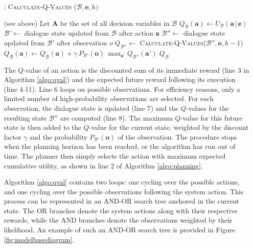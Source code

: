 \begin{algorithm}[h!]
\caption{: \textsc{Calculate-Q-Values} ($\mathcal{B}, \mathbf{e}, h)$}
\begin{algorithmic}[1] \vspace{1mm}
\REQUIRE (see above)
\STATE Let $\mathbf{A}$ be the set of all decision variables in $\mathcal{B}$
\STATE $Q_{\mathcal{B}}(\mathbf{a}) \leftarrow U_{\mathcal{B}}(\mathbf{a} \, | \, \mathbf{e})$
\STATE $\mathcal{B}' \leftarrow $ dialogue state updated from $\mathcal{B}$ after action $\mathbf{a}$
\STATE $\mathcal{B}'' \leftarrow $ dialogue state updated from $\mathcal{B}'$ after observation $o$
\STATE $Q_{\mathcal{B}''} \leftarrow $ \textsc{Calculate-Q-Values}($\mathcal{B}'', \mathbf{e}, h -1$)
\STATE $Q_{\mathcal{B}}(\mathbf{a}) \leftarrow Q_{\mathcal{B}}(\mathbf{a}) + \gamma \ P_{\mathcal{B}'}(\mathbf{o}) \ \max_{\mathbf{a}'} Q_{\mathcal{B}''}(\mathbf{a}')$
\ENDFOR
\ENDIF
\ENDFOR
\RETURN $Q_{\mathcal{B}}$
\end{algorithmic} 
\label{algo:qval}
\end{algorithm}

The $Q$-value of an action is the discounted sum of its immediate reward (line 3 in Algorithm \ref{algo:qval}) and the expected future reward following its execution (line 4-11).  Line 6 loops on possible observations.  For efficiency reasons, only a limited number of high-probability observations are selected. For each observation, the dialogue state is updated (line 7) and the $Q$-values for the resulting state $\mathcal{B}''$ are computed (line 8).  The maximum $Q$-value for this future state is then added to the $Q$-value for the current state, weighted by the discount factor $\gamma$ and the probability $P_{\mathcal{B}'} (\mathbf{o})$ of the observation.  The procedure stops when the planning horizon has been reached, or the algorithm has run out of time. The planner then simply selects the action with maximum expected cumulative utility, as shown in line 2 of Algorithm \ref{algo:planning}. 

Algorithm \ref{algo:qval} contains two loops: one cycling over the possible actions, and one cycling over the possible observations following the system action. This process can be represented in an AND-OR search tree anchored in the current state. The OR branches denote the system actions along with their respective rewards, while the AND branches denote the observations weighted by their likelihood. An example of such an AND-OR search tree is provided in Figure \ref{fig:modelbasediagram}.


